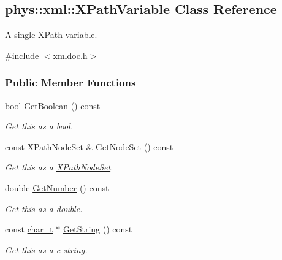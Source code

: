 \hypertarget{classphys_1_1xml_1_1XPathVariable}{
\subsection{phys::xml::XPathVariable Class Reference}
\label{classphys_1_1xml_1_1XPathVariable}
}


A single XPath variable.  




{\ttfamily \#include $<$xmldoc.h$>$}

\subsubsection*{Public Member Functions}
\begin{DoxyCompactItemize}
\item 
bool \hyperlink{classphys_1_1xml_1_1XPathVariable_a1185ea821883dabd929fcad9b9e80abf}{GetBoolean} () const 
\begin{DoxyCompactList}\small\item\em Get this as a bool. \item\end{DoxyCompactList}\item 
const \hyperlink{classphys_1_1xml_1_1XPathNodeSet}{XPathNodeSet} \& \hyperlink{classphys_1_1xml_1_1XPathVariable_ae9b8d398c2fbb885b046713713416991}{GetNodeSet} () const 
\begin{DoxyCompactList}\small\item\em Get this as a \hyperlink{classphys_1_1xml_1_1XPathNodeSet}{XPathNodeSet}. \item\end{DoxyCompactList}\item 
double \hyperlink{classphys_1_1xml_1_1XPathVariable_adafbffe4163bfe67a831cb100e9689ed}{GetNumber} () const 
\begin{DoxyCompactList}\small\item\em Get this as a double. \item\end{DoxyCompactList}\item 
const \hyperlink{namespacephys_1_1xml_afc87705cd1c2917d87b879715a2d8f6e}{char\_\-t} $\ast$ \hyperlink{classphys_1_1xml_1_1XPathVariable_a7896ce880f6fa91fb9a0eeb4d758f2f8}{GetString} () const 
\begin{DoxyCompactList}\small\item\em Get this as a c-\/string. \item\end{DoxyCompactList}\item 

\end{DoxyCompactItemize}
